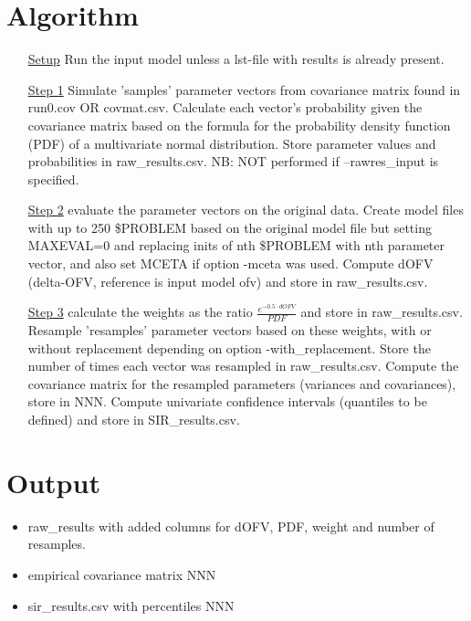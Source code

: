 \section{Algorithm}
\begin{itemize}
\item[\underline{Setup}] Run the input model unless a lst-file with results is already present.
\item[\underline{Step 1}] Simulate 'samples' parameter vectors from covariance matrix found in run0.cov OR covmat.csv. 
Calculate each vector’s probability given the covariance matrix based on the formula for the probability 
density function (PDF) of a multivariate normal distribution. Store parameter values and probabilities in raw\_results.csv.
NB: NOT performed if –rawres\_input is specified.
\item[\underline{Step 2}] evaluate the parameter vectors on the original data.
Create model files with up to 250 \$PROBLEM based on the original model file but setting MAXEVAL=0
and replacing inits of nth \$PROBLEM with nth parameter vector, and also set MCETA if option -mceta was used. Compute dOFV 
(delta-OFV, reference is input model ofv) and store in raw\_results.csv.
\item[\underline{Step 3}] calculate the weights as the ratio $\frac{e^{-0.5\cdot dOFV}}{PDF}$ and store in raw\_results.csv. 
Resample 'resamples' parameter vectors based on these weights, with or without replacement depending on option -with\_replacement. 
Store the number of times each vector was resampled in raw\_results.csv.
Compute the covariance matrix for the resampled parameters (variances and covariances), 
store in NNN. 
Compute univariate confidence intervals (quantiles to be defined) and store in SIR\_results.csv.
\end{itemize}

\section{Output}
\begin{itemize}
\item raw\_results with added columns for dOFV, PDF, weight and number of resamples.
\item empirical covariance matrix NNN
\item sir\_results.csv with percentiles NNN
\end{itemize}


